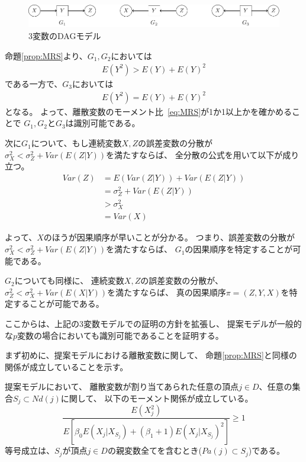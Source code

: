 \begin{figure}[ht]
  \centering
  \includegraphics{./picture/prop_three_variate.pdf}
  \caption{3変数のDAGモデル}
  \label{fig:prop_three_variate}
\end{figure}

命題\ref{prop:MRS}より、$G_1, G_2$においては
\begin{align*}
  E(Y^2) > E(Y) + E(Y)^2
\end{align*}
である一方で、$G_3$においては
\begin{align*}
  E(Y^2) = E(Y) + E(Y)^2
\end{align*}
となる。
よって、離散変数のモーメント比~\eqref{eq:MRS}が1か1以上かを確かめることで
$G_1, G_2$と$G_3$は識別可能である。

次に$G_1$について、もし連続変数$X, Z$の誤差変数の分散が
$\sigma_X^2 < \sigma_Z^2 + \mathit{Var}(E(Z|Y))$を満たすならば、
全分散の公式を用いて以下が成り立つ。
\begin{align*}
  \mathit{Var}(Z) &= E(\mathit{Var}(Z|Y)) + \mathit{Var}(E(Z|Y)) \\
                  &= \sigma_Z^2 + \mathit{Var}(E(Z|Y)) \\
                  &> \sigma_X^2 \\
                  &= \mathit{Var}(X)
\end{align*}

よって、$X$のほうが因果順序が早いことが分かる。
つまり、誤差変数の分散が$\sigma_X^2 < \sigma_Z^2 + \mathit{Var}(E(Z|Y))$を満たすならば、
$G_1$の因果順序を特定することが可能である。

$G_2$についても同様に、
連続変数$X, Z$の誤差変数の分散が、
$\sigma_Z^2 < \sigma_X^2 + \mathit{Var}(E(X|Y))$を満たすならば、
真の因果順序$\pi = (Z, Y, X)$を特定することが可能である。


ここからは、上記の3変数モデルでの証明の方針を拡張し、
提案モデルが一般的な$p$変数の場合においても識別可能であることを証明する。

まず初めに、提案モデルにおける離散変数に関して、
命題\ref{prop:MRS}と同様の関係が成立していることを示す。

\begin{lemm}
  提案モデルにおいて、
  離散変数が割り当てあられた任意の頂点$j \in D$、任意の集合$S_j \subset Nd(j)$に関して、
  以下のモーメント関係が成立している。
  \begin{equation}
    \frac{E(X_j^2)}
    {E \left[ \beta_0 E(X_j | X_{S_j}) + (\beta_1 + 1)E(X_j | X_{S_j})^2 \right]}
    \geq 1
    \label{prop_MRS}
  \end{equation}
  等号成立は、$S_j$が頂点$j \in D$の親変数全てを含むとき($Pa(j) \subset S_j$)である。
  \label{lem_prop_MRS}
\end{lemm}

